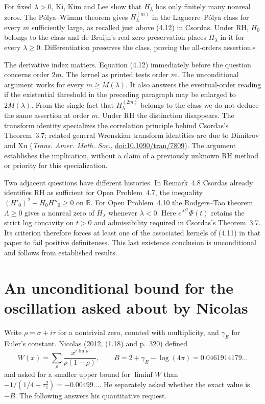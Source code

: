 \documentclass[11pt,a4paper]{article}
\begin{document}
For fixed $\lambda>0$, Ki, Kim and Lee show that $H_\lambda$ has only
finitely many nonreal zeros. The P\'olya--Wiman theorem gives
$H_\lambda^{(m)}$ in the Laguerre--P\'olya class for every $m$ sufficiently
large, as recalled just above (4.12) in Csordas. Under RH, $H_0$ belongs
to the class and de Bruijn's real-zero preservation places $H_\lambda$
in it for every $\lambda\ge0$. Differentiation preserves the class,
proving the all-orders assertion.\hfill$\square$

The derivative index matters. Equation (4.12) immediately before the
question concerns order $2m$. The kernel as printed tests order $m$.
The unconditional argument works for every $m\ge M(\lambda)$. It also
answers the eventual-order reading if the existential threshold in the
preceding paragraph may be enlarged to $2M(\lambda)$. From the single
fact that $H_\lambda^{(2m)}$ belongs to the class we do not deduce the
same assertion at order $m$. Under RH the distinction disappears.
The transform identity specializes the correlation principle behind
Csordas's Theorem~3.7; related general Wronskian transform identities
are due to Dimitrov and Xu (\emph{Trans. Amer. Math. Soc.},
\href{https://doi.org/10.1090/tran/7809}{doi:10.1090/tran/7809}).
The argument establishes the implication, without a claim of a previously
unknown RH method or priority for this specialization.

Two adjacent questions have different histories. In Remark~4.8 Csordas
already identifies RH as sufficient for Open Problem~4.7, the inequality
$(H'_0)^2-H_0H''_0\ge0$ on $\mathbb R$. For Open Problem~4.10 the
Rodgers--Tao theorem \cite{rt} $\Lambda\ge0$ gives a nonreal zero of $H_\lambda$
whenever $\lambda<0$. Here $e^{\lambda t^2}\Phi(t)$ retains the strict
log concavity on $t>0$ and admissibility required in Csordas's
Theorem~3.7. Its criterion therefore forces at least one of the associated
kernels of (4.11) in that paper to fail positive definiteness. This last
existence conclusion is unconditional and follows from established results.

\section{An unconditional bound for the oscillation asked about by Nicolas}
Write $\rho=\sigma+i\tau$ for a nontrivial zero, counted with multiplicity,
and $\gamma_E$ for Euler's constant. Nicolas (2012, (1.18) and p.~320)
defined
\[
 W(x)=\sum_\rho\frac{x^{i\operatorname{Im}\rho}}{\rho(1-\rho)},
 \qquad B=2+\gamma_E-\log(4\pi)=0.0461914179\ldots
\]
and asked for a smaller upper bound for $\liminf W$ than
$-1/(1/4+\tau_1^2)=-0.00499\ldots$. He separately asked whether the
exact value is $-B$. The following answers his quantitative request.
\end{document}
